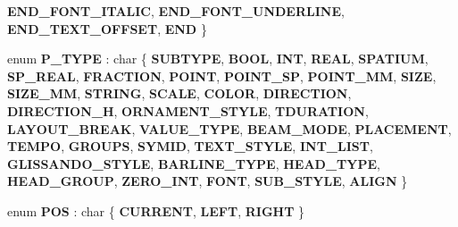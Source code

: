 \begin{DoxyCompactItemize}
{\bfseries E\+N\+D\+\_\+\+F\+O\+N\+T\+\_\+\+I\+T\+A\+L\+IC}, 
{\bfseries E\+N\+D\+\_\+\+F\+O\+N\+T\+\_\+\+U\+N\+D\+E\+R\+L\+I\+NE}, 
{\bfseries E\+N\+D\+\_\+\+T\+E\+X\+T\+\_\+\+O\+F\+F\+S\+ET}, 
{\bfseries E\+ND}
 \}
\item 
\mbox{\label{namespace_ms_abc97550db96314c3b3e5d2d11f10ce5f}} 
enum {\bfseries P\+\_\+\+T\+Y\+PE} \+: char \{ \newline
{\bfseries S\+U\+B\+T\+Y\+PE}, 
{\bfseries B\+O\+OL}, 
{\bfseries I\+NT}, 
{\bfseries R\+E\+AL}, 
\newline
{\bfseries S\+P\+A\+T\+I\+UM}, 
{\bfseries S\+P\+\_\+\+R\+E\+AL}, 
{\bfseries F\+R\+A\+C\+T\+I\+ON}, 
{\bfseries P\+O\+I\+NT}, 
\newline
{\bfseries P\+O\+I\+N\+T\+\_\+\+SP}, 
{\bfseries P\+O\+I\+N\+T\+\_\+\+MM}, 
{\bfseries S\+I\+ZE}, 
{\bfseries S\+I\+Z\+E\+\_\+\+MM}, 
\newline
{\bfseries S\+T\+R\+I\+NG}, 
{\bfseries S\+C\+A\+LE}, 
{\bfseries C\+O\+L\+OR}, 
{\bfseries D\+I\+R\+E\+C\+T\+I\+ON}, 
\newline
{\bfseries D\+I\+R\+E\+C\+T\+I\+O\+N\+\_\+H}, 
{\bfseries O\+R\+N\+A\+M\+E\+N\+T\+\_\+\+S\+T\+Y\+LE}, 
{\bfseries T\+D\+U\+R\+A\+T\+I\+ON}, 
{\bfseries L\+A\+Y\+O\+U\+T\+\_\+\+B\+R\+E\+AK}, 
\newline
{\bfseries V\+A\+L\+U\+E\+\_\+\+T\+Y\+PE}, 
{\bfseries B\+E\+A\+M\+\_\+\+M\+O\+DE}, 
{\bfseries P\+L\+A\+C\+E\+M\+E\+NT}, 
{\bfseries T\+E\+M\+PO}, 
\newline
{\bfseries G\+R\+O\+U\+PS}, 
{\bfseries S\+Y\+M\+ID}, 
{\bfseries T\+E\+X\+T\+\_\+\+S\+T\+Y\+LE}, 
{\bfseries I\+N\+T\+\_\+\+L\+I\+ST}, 
\newline
{\bfseries G\+L\+I\+S\+S\+A\+N\+D\+O\+\_\+\+S\+T\+Y\+LE}, 
{\bfseries B\+A\+R\+L\+I\+N\+E\+\_\+\+T\+Y\+PE}, 
{\bfseries H\+E\+A\+D\+\_\+\+T\+Y\+PE}, 
{\bfseries H\+E\+A\+D\+\_\+\+G\+R\+O\+UP}, 
\newline
{\bfseries Z\+E\+R\+O\+\_\+\+I\+NT}, 
{\bfseries F\+O\+NT}, 
{\bfseries S\+U\+B\+\_\+\+S\+T\+Y\+LE}, 
{\bfseries A\+L\+I\+GN}
 \}
\item 
\mbox{\label{namespace_ms_aa15d8b46ea58d6bb59b084d6d7bcff7d}} 
enum {\bfseries P\+OS} \+: char \{ {\bfseries C\+U\+R\+R\+E\+NT}, 
{\bfseries L\+E\+FT}, 
{\bfseries R\+I\+G\+HT}
 \}
\item 
\mbox{\label{namespace_ms_a698a5875115e45678413e5c10c267364}} 

\end{DoxyCompactItemize}
